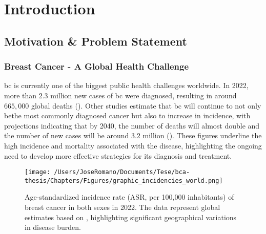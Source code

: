 
%

\chapter{Introduction}
\label{cha:introduction}

\section{Motivation \& Problem Statement}
\label{sec:motivation+problem-statement}
\subsection{Breast Cancer - A Global Health Challenge}

\gls{bc} is currently one of the biggest public health challenges worldwide. In
2022, more than $2.3$ million new cases of \gls{bc} were diagnosed, resulting in
around $665,\!000$ global deaths (\textcite{bcaData2024_bray}). Other studies
estimate that \gls{bc} will continue to not only bethe most commonly diagnosed
cancer but also to increase in incidence, with projections indicating that by
2040, the number of deaths will almost double and the number of new cases will
be around $3.2$ million (\textcite{bca_data_Arnold2022Current}). These figures
underline the high incidence and mortality associated with the disease,
highlighting the ongoing need to develop more effective strategies for
its diagnosis and treatment.

\begin{figure}[h!]
  \centering
  \texttt{[image: /Users/JoseRomano/Documents/Tese/bca-thesis/Chapters/Figures/graphic\_incidencies\_world.png]}
  \caption{Age-standardized incidence rate (ASR, per 100,000 inhabitants) of breast cancer in both sexes in 2022. 
  The data represent global estimates based on \textcite{GLOBOCAN2022}, highlighting significant geographical variations in disease burden.}
\end{figure}

